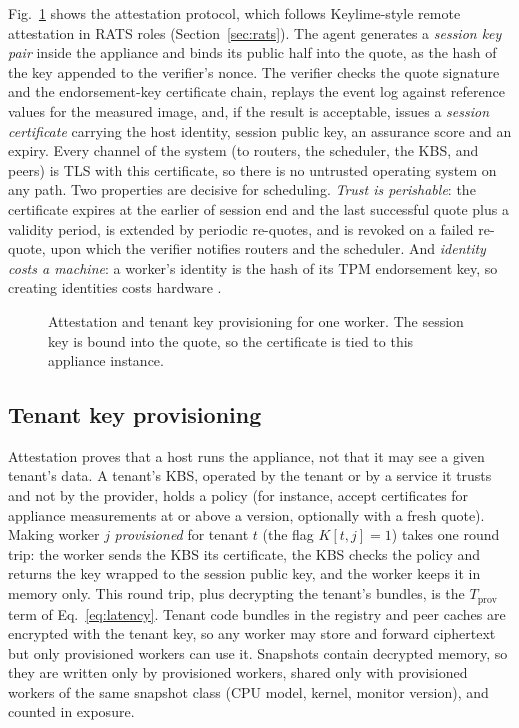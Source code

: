 Fig.~\ref{fig:attest} shows the attestation protocol, which follows Keylime-style remote attestation \cite{schear2016keylime} in RATS
roles (Section~\ref{sec:rats}). The agent generates a \emph{session key pair} inside the appliance and binds its public half
into the quote, as the hash of the key appended to the verifier's nonce. The verifier checks the quote signature and the endorsement-key
certificate chain, replays the event log against reference values for the measured image, and, if the result is acceptable, issues a
\emph{session certificate} carrying the host identity, session public key, an assurance score and an expiry. Every channel of the system
(to routers, the scheduler, the KBS, and peers) is TLS with this certificate, so there is no untrusted operating system on any path. Two
properties are decisive for scheduling. \emph{Trust is perishable}: the certificate expires at the earlier of session end and
the last successful quote plus a validity period, is extended by periodic re-quotes, and is revoked on a failed re-quote, upon which the verifier
notifies routers and the scheduler. And \emph{identity costs a machine}: a worker's identity is the hash of its TPM endorsement key, so creating identities
costs hardware \cite{douceur2002sybil}.

\begin{figure}[t]
\centering
\resizebox{\columnwidth}{!}{}
\caption{Attestation and tenant key provisioning for one worker. The session key is bound into the quote, so the certificate is
tied to this appliance instance.}
\label{fig:attest}
\end{figure}

\subsection{Tenant key provisioning}
\label{sec:provisioning}
Attestation proves that a host runs the appliance, not that it may see a given tenant's data. A tenant's KBS, operated by the tenant or by a service it trusts and not by the provider, holds a policy (for
instance, accept certificates for appliance measurements at or above a version, optionally with a fresh quote). Making worker $j$
\emph{provisioned} for tenant $t$ (the flag $K[t,j]=1$) takes one round trip: the worker sends the KBS its certificate, the KBS checks the policy and returns the key
wrapped to the session public key, and the worker keeps it in memory only. This round trip, plus decrypting the tenant's bundles, is the
$T_{\text{prov}}$ term of Eq.~\eqref{eq:latency}. Tenant code bundles in the registry and peer caches are encrypted with the tenant key, so any
worker may store and forward ciphertext but only provisioned workers can use it. Snapshots contain decrypted memory, so they are written
only by provisioned workers, shared only with provisioned workers of the same snapshot class (CPU model, kernel, monitor version), and counted in
exposure.

